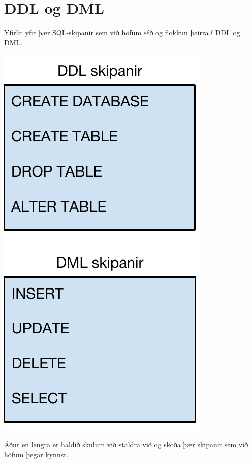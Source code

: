 \section{DDL og DML}
\begin{marginfigure}[-6cm]
\caption[DDL og DML]{Yfirlit yfir þær SQL-skipanir sem við höfum séð og flokkun þeirra í DDL og DML.}
\label{mynd:inner-join}
\centering
\includegraphics[width=\linewidth]{myndir/ddl-dml}
\end{marginfigure}
Áður en lengra er haldið skulum við staldra við og skoða þær skipanir sem við höfum þegar kynnst.

